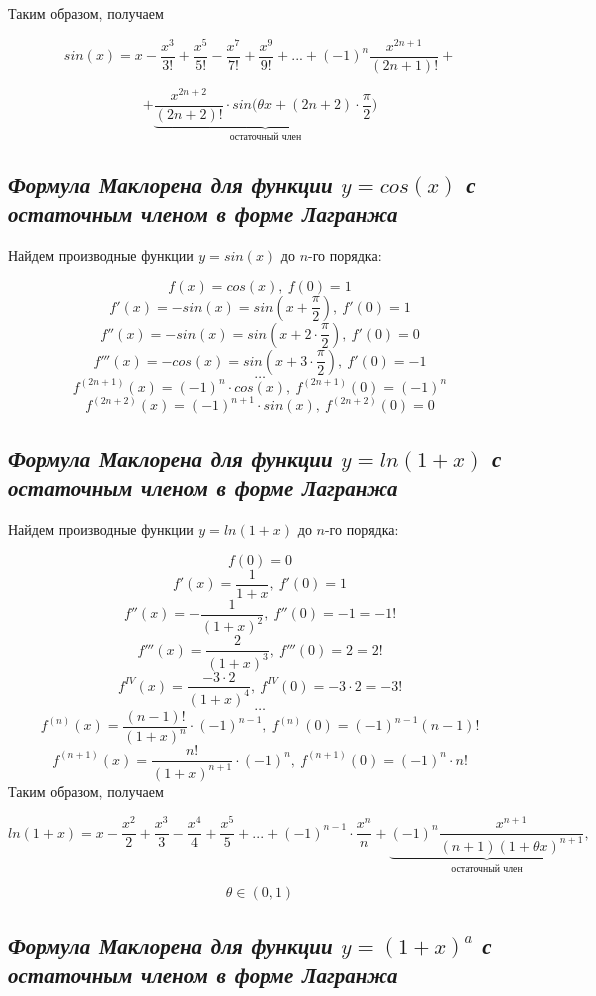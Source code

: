 Таким образом, получаем
\begin{mainQuote}

$$sin(x) = x - \frac{x^3}{3!} + \frac{x^5}{5!}- \frac{x^7}{7!} + \frac{x^9}{9!}+...+(-1)^{n}\frac{x^{2n+1}}{(2n + 1)!} +$$

$$+ \underbrace{\frac{x^{2n+2}}{(2n + 2)!}\cdot sin\bigg(\theta x + (2n + 2)\cdot\frac{\pi}{2}\bigg)}_{\text{остаточный \ член}} $$
\end{mainQuote}
\newpage 
\subsection{\textit{Формула Маклорена для функции $y = cos(x)$ с остаточным членом в форме Лагранжа}}

Найдем производные функции $y = sin(x)$ до $n$-го порядка:

$$f(x) = cos(x), \ f(0) = 1$$ $$f'(x) = -sin(x) = sin(x + \frac{\pi}{2}), \ f'(0)=1$$ $$f''(x) = -sin(x) = sin(x + 2\cdot \frac{\pi}{2}), \ f'(0)=0$$ $$f'''(x) = -cos(x) = sin(x + 3\cdot \frac{\pi}{2}), \ f'(0) = -1$$ $$\dots$$ $$f^{(2n + 1)}(x) = (-1)^{n}\cdot cos(x), \ f^{(2n + 1)}(0) = (-1)^{n}$$ $$f^{(2n + 2)}(x) = (-1)^{n+1}\cdot sin(x), \ f^{(2n + 2)}(0) = 0$$
\newpage 
\subsection{\textit{Формула Маклорена для функции $y = ln(1 + x)$ с остаточным членом в форме Лагранжа}}

Найдем производные функции $y = ln(1+x)$ до $n$-го порядка:

$$f(0) = 0$$ $$f'(x) = \frac{1}{1+x}, \ f'(0) = 1$$ $$f''(x) = -\frac{1}{(1+x)^2}, \ f''(0) = -1 = -1!$$ $$f'''(x) = \frac{2}{(1+x)^3}, \ f'''(0) = 2 = 2!$$ $$f^{IV}(x) = \frac{-3\cdot 2}{(1+x)^4}, \ f^{IV}(0) = -3\cdot 2 = -3!$$ $$\dots$$ $$f^{(n)}(x) = \frac{(n - 1)!}{(1 + x)^n}\cdot (-1)^{n - 1}, \ f^{(n)}(0)=(-1)^{n-1}(n-1)! $$ $$f^{(n+1)}(x) = \frac{n!}{(1 + x)^{n+1}}\cdot (-1)^{n}, \ f^{(n+1)}(0)=(-1)^{n}\cdot n!$$ Таким образом, получаем
\begin{mainQuote}

$$ln(1 + x) = x - \frac{x^2}{2}+ \frac{x^3}{3}- \frac{x^4}{4}+ \frac{x^5}{5} + ... + (-1)^{n - 1}\cdot \frac{x^n}{n} + \underbrace{(-1)^n\frac{x^{n+1}}{(n+1)(1 + \theta x)^{n+1}}}_{\text{остаточный \ член}}, $$

$$ \theta \in (0, 1)$$
\end{mainQuote}
\subsection{\textit{Формула Маклорена для функции $y = (1 + x)^a$ с остаточным членом в форме Лагранжа}}

